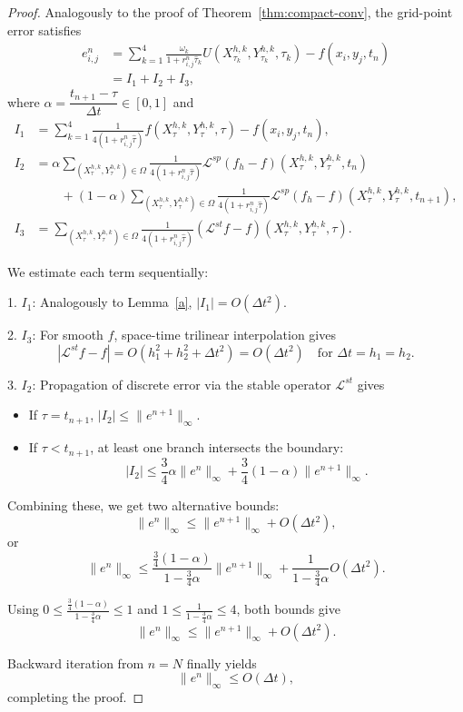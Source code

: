 \documentclass[11pt]{article}
\theoremstyle{mythm}
\theoremstyle{definition}
\begin{document}
	\begin{proof}
		Analogously to the proof of Theorem~\ref{thm:compact-conv}, the grid-point error satisfies
		\[
		\begin{aligned}
			e_{i,j}^n 
			&= \sum_{k=1}^4 \frac{\omega_k}{1+r_{i,j}^n \hat{\tau}_k}
			U\!\left(X_{\tau_k}^{h,k}, Y_{\tau_k}^{h,k}, \tau_k\right)
			- f(x_i, y_j, t_n) \\
			&= I_1 + I_2 + I_3 ,
		\end{aligned}
		\]
		where $\alpha = \dfrac{t_{n+1}-\tau}{\Delta t}\in[0,1]$ and
		\[
		\begin{aligned}
			I_1 &= \sum_{k=1}^4 
			\frac{1}{4(1+r_{i,j}^n \hat{\tau})}
			f\!\left(X_{\tau}^{h,k}, Y_{\tau}^{h,k}, \tau\right)
			- f(x_i, y_j, t_n), \\[0.4em]
			I_2 &= \alpha\sum_{(X_{\tau}^{h,k}, Y_{\tau}^{h,k}) \in \Omega}
			\frac{1}{4(1+r_{i,j}^n \hat{\tau})}
			\mathcal{L}^{sp}(f_h - f)\left(X_{\tau}^{h,k}, Y_{\tau}^{h,k}, t_n\right) \\
			&\qquad + (1-\alpha)\sum_{(X_{\tau}^{h,k}, Y_{\tau}^{h,k}) \in \Omega}
			\frac{1}{4(1+r_{i,j}^n \hat{\tau})}
			\mathcal{L}^{sp}(f_h - f)\left(X_{\tau}^{h,k}, Y_{\tau}^{h,k}, t_{n+1}\right), \\[0.4em]
			I_3 &= 
			\sum_{(X_{\tau}^{h,k}, Y_{\tau}^{h,k}) \in \Omega} \frac{1}{4(1+r_{i,j}^n \hat{\tau})}
			(\mathcal{L}^{st} f - f)\left(X_{\tau}^{h,k}, Y_{\tau}^{h,k}, \tau\right).
		\end{aligned}
		\]
		
		We estimate each term sequentially:
		
		1. $I_1$: Analogously to Lemma~\ref{a}, $|I_1| = O(\Delta t^2)$.
		
		2. $I_3$: For smooth $f$, space-time trilinear interpolation gives
		\[
		|\mathcal{L}^{st} f - f| = O(h_1^2 + h_2^2 + \Delta t^2) = O(\Delta t^2) \quad \text{for } \Delta t = h_1 = h_2.
		\]
		
		3. $I_2$: Propagation of discrete error via the stable operator $\mathcal{L}^{st}$ gives
		\begin{itemize}
			\item If $\tau = t_{n+1}$, $|I_2| \le \|e^{n+1}\|_\infty$.
			\item If $\tau < t_{n+1}$, at least one branch intersects the boundary:
			\[
			|I_2| \le \frac{3}{4}\alpha \|e^n\|_\infty + \frac{3}{4}(1-\alpha)\|e^{n+1}\|_\infty.
			\]
		\end{itemize}
		
		Combining these, we get two alternative bounds:
		\[
		\| e^n \|_\infty \le \|e^{n+1}\|_\infty + O(\Delta t^2),
		\]
		or
		\[
		\| e^n \|_\infty
		\le 
		\frac{\frac{3}{4}(1-\alpha)}{1 - \frac{3}{4}\alpha}\|e^{n+1}\|_\infty
		+\frac{1}{1 - \frac{3}{4}\alpha} O(\Delta t^2).
		\]
		
		Using $0 \le \frac{\frac{3}{4}(1-\alpha)}{1 - \frac{3}{4}\alpha} \le 1$ and $1 \le \frac{1}{1 - \frac{3}{4}\alpha} \le 4$, both bounds give
		\[
		\|e^n\|_\infty \le \|e^{n+1}\|_\infty + O(\Delta t^2).
		\]
		
		Backward iteration from $n = N$ finally yields
		\[
		\|e^n\|_\infty \le O(\Delta t),
		\]
		completing the proof.
	\end{proof}
\end{document}
